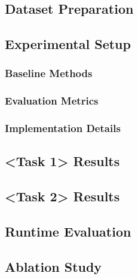 \documentclass[a4paper, 11pt]{article}
\begin{document}
\subsection{Dataset Preparation}

\subsection{Experimental Setup}
\subsubsection{Baseline Methods}
\subsubsection{Evaluation Metrics}
\subsubsection{Implementation Details}

\subsection{<Task 1> Results}

\subsection{<Task 2> Results}

\subsection{Runtime Evaluation}

\subsection{Ablation Study}

\newpage
\end{document}
